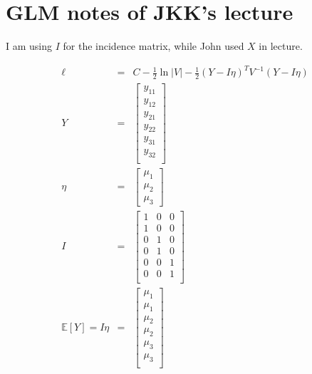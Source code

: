 \documentclass[11pt]{article}
\newcommand{\expect}[0]{\mathbb{E}}
\begin{document}

\section*{GLM notes of JKK's lecture}
I am using $I$ for the incidence matrix, while John used $X$ in lecture.

\begin{eqnarray}
  \ell & = & C - \frac{1}{2}\ln|V| -\frac{1}{2}(Y-I\eta)^TV^{-1}(Y-I\eta)\\
  Y & = & \left[\begin{array}{c} y_{11} \\
  	y_{12} \\
  	y_{21} \\
  	y_{22} \\
  	y_{31} \\
  	y_{32} \\
  	\end{array}\right]\\
  \eta & = & \left[\begin{array}{c} \mu_{1} \\
  	\mu_{2} \\
  	\mu_{3}\end{array}\right]\\
  I & = & \left[\begin{array}{ccc} 1 & 0 & 0 \\
  	1 & 0 & 0 \\
  	0 & 1 & 0 \\
  	0 & 1 & 0 \\
  	0 & 0 & 1 \\
  	0 & 0 & 1 \\
  	\end{array}\right]\\
  	\expect[{Y}] = I\eta & = & \left[\begin{array}{c} \mu_{1} \\
  	\mu_{1} \\
  	\mu_{2} \\
  	\mu_{2} \\
  	\mu_{3} \\
  	\mu_{3} \\
  	\end{array}\right]\\
\end{eqnarray}
\end{document}
